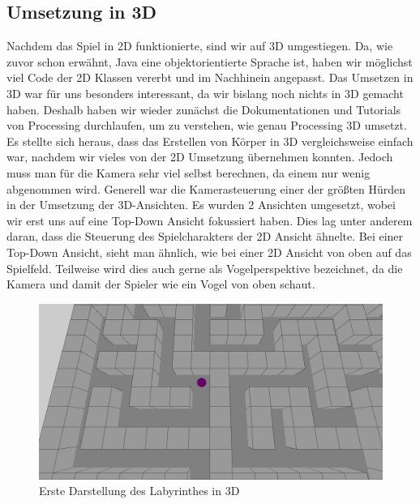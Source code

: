 \subsection{Umsetzung in 3D}\label{subsec:umsetzung-in-3D}
Nachdem das Spiel in 2D funktionierte, sind wir auf 3D umgestiegen. Da, wie zuvor schon erwähnt, Java eine objektorientierte Sprache ist, haben wir möglichst viel Code der 2D Klassen vererbt und im Nachhinein angepasst.
Das Umsetzen in 3D war für uns besonders interessant, da wir bislang noch nichts in 3D gemacht haben. Deshalb haben wir wieder zunächst die Dokumentationen und Tutorials von Processing durchlaufen, um zu verstehen, wie genau Processing 3D umsetzt. Es stellte sich heraus, dass das Erstellen von Körper in 3D vergleichsweise einfach war, nachdem wir vieles von der 2D Umsetzung übernehmen konnten. Jedoch muss man für die Kamera sehr viel selbst berechnen, da einem nur wenig abgenommen wird. Generell war die Kamerasteuerung einer der größten Hürden in der Umsetzung der 3D-Ansichten.
Es wurden 2 Ansichten umgesetzt, wobei wir erst uns auf eine Top-Down Ansicht fokussiert haben. Dies lag unter anderem daran, dass die Steuerung des Spielcharakters der 2D Ansicht ähnelte. Bei einer Top-Down Ansicht, sieht man ähnlich, wie bei einer 2D Ansicht von oben auf das Spielfeld. Teilweise wird dies auch gerne als Vogelperspektive bezeichnet, da die Kamera und damit der Spieler wie ein Vogel von oben schaut.
\begin{figure}[h]
    \centering
    \includegraphics[width=\paperwidth-3in]{../assets/img/Fr3DTopDown.PNG}
    \caption{Erste Darstellung des Labyrinthes in 3D}
    \label{fig:TopDown}
\end{figure}

